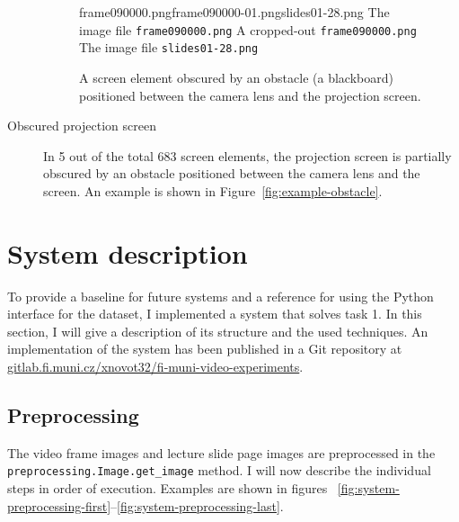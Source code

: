 \begin{description}
  \begin{figure}[!t]
    \inputminted{xml}{fig/examples/obstacle/example.xml}\par
      {frame090000.png}{frame090000-01.png}{slides01-28.png}%
      {The image file \texttt{frame090000.png}}%
      {A cropped-out \texttt{frame090000.png}}%
      {The image file \texttt{slides01-28.png}}
    \caption{A screen element obscured by an obstacle (a blackboard) positioned
      between the camera lens and the projection screen.}
    \label{fig:example-obstacle}
    \label{fig:example-last}
  \end{figure}
  \item[Obscured projection screen] In 5 out of the total 683 screen elements,
    the projection screen is partially obscured by an obstacle positioned
    between the camera lens and the screen.
    An example is shown in Figure~\ref{fig:example-obstacle}.
\end{description}

\section{System description}
\label{sec:system-description}
To provide a baseline for future systems and a reference for using the Python
interface for the dataset, I implemented a system that solves task 1. In this
section, I will give a description of its structure and the used techniques.
An implementation of the system has been published in a Git repository at
\href{https://gitlab.fi.muni.cz/xnovot32/fi-muni-video-experiments}%
     {gitlab.fi.muni.cz/xnovot32/fi-muni-video-experiments}.

\FloatBarrier
\subsection{Preprocessing}
The video frame images and lecture slide page images are preprocessed in the
\texttt{preprocessing.Image.get\_image} method. I will now describe the
individual steps in order of execution. Examples are shown in figures~%
\ref{fig:system-preprocessing-first}--\ref{fig:system-preprocessing-last}.

